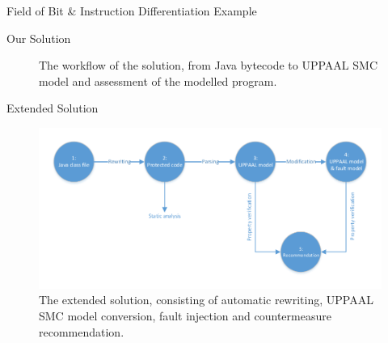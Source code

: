 \begin{frame}[fragile]{Field of Bit \& Instruction Differentiation}
Example
\end{frame}

\begin{frame}[fragile]{Our Solution}
\begin{center}
\begin{figure}
\def\svgwidth{1.13\columnwidth}

\caption{The workflow of the solution, from Java bytecode to UPPAAL SMC model and assessment of the modelled program.}
\label{fig:workflow_new}
\end{figure}
\end{center}
\end{frame}


\begin{frame}[fragile]{Extended Solution}


\begin{figure}
\centering
\includegraphics[scale=0.65]{figures/workflow.pdf}
\caption{\footnotesize The extended solution, consisting of automatic rewriting, UPPAAL SMC model conversion, fault injection and countermeasure recommendation.}
\label{test}
\end{figure}
\end{frame}